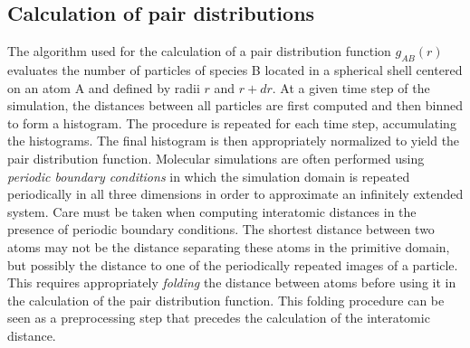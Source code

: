 \subsection*{Calculation of pair distributions}
The algorithm used for the calculation of a pair distribution function $g_{AB}(r)$ evaluates the number of particles of species B located in a spherical shell centered on an atom A and defined by radii $r$ and $r+dr$. At a given time step of the simulation, the distances between all particles are first computed and then binned to form a histogram. The procedure is repeated for each time step, accumulating the histograms. The final histogram is then appropriately normalized to yield the pair distribution function.  
Molecular simulations are often performed using {\em periodic boundary conditions} in which the simulation domain is repeated periodically in all three dimensions in order to approximate an infinitely extended system. Care must be taken when computing interatomic distances in the presence of periodic boundary conditions. The shortest distance between two atoms may not be the distance separating these atoms in the primitive domain, but possibly the distance to one of the periodically repeated images of a particle. This requires appropriately {\em folding} the distance between atoms before using it in the calculation of the pair distribution function. This folding procedure can be seen as a preprocessing step that precedes the calculation of the interatomic distance.